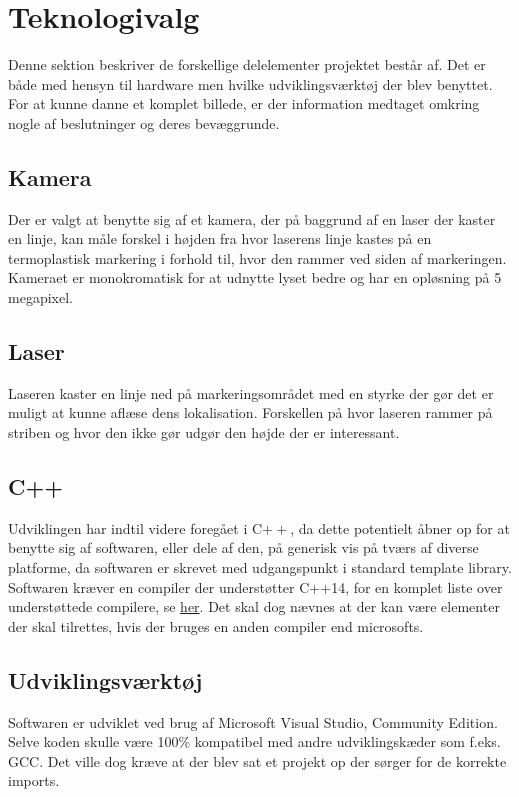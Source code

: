 \section{Teknologivalg}
Denne sektion beskriver de forskellige delelementer projektet består af. Det er både med hensyn til hardware men hvilke udviklingsværktøj der blev benyttet. For at kunne danne et komplet billede, er der information medtaget omkring nogle af beslutninger og deres bevæggrunde. 

\subsection{Kamera}
Der er valgt at benytte sig af et kamera, der på baggrund af en laser der kaster en linje, kan måle forskel i højden fra hvor laserens linje kastes på en termoplastisk markering i forhold til, hvor den rammer ved siden af markeringen.
Kameraet er monokromatisk for at udnytte lyset bedre og har en opløsning på 5 megapixel.

\subsection{Laser}
Laseren kaster en linje ned på markeringsområdet med en styrke der gør det er muligt at kunne aflæse dens lokalisation. Forskellen på hvor laseren rammer på striben og hvor den ikke gør udgør den højde der er interessant.

\subsection{C++}
Udviklingen har indtil videre foregået i C$++$, da dette potentielt åbner op for at benytte sig af softwaren, eller dele af den, på generisk vis på tværs af diverse platforme, da softwaren er skrevet med udgangspunkt i standard template library.
Softwaren kræver en compiler der understøtter C++14, for en komplet liste over understøttede compilere, se \href{http://en.cppreference.com/w/cpp/compiler_support}{her}. Det skal dog nævnes at der kan være elementer der skal tilrettes, hvis der bruges en anden compiler end microsofts.

\subsection{Udviklingsværktøj}
Softwaren er udviklet ved brug af Microsoft Visual Studio, Community Edition. Selve koden skulle være 100\% kompatibel med andre udviklingskæder som f.eks. GCC. Det ville dog kræve at der blev sat et projekt op der sørger for de korrekte imports.

